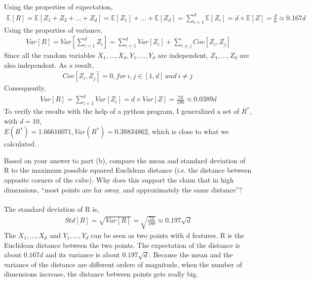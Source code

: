 \documentclass{myhw}
\begin{document}
\begin{homeworkProblem}
\begin{homeworkSection}
\\
Using the properties of expectation, 
\begin{gather*}
\mathbb{E}[R] = \mathbb{E}[Z_1 + Z_2 + ... + Z_d] = \mathbb{E}[Z_1] + ... + \mathbb{E}[Z_d] = \sum_{i=1}^d{\mathbb{E}[Z_i]} = d \times \mathbb{E}[Z] = \frac{d}{6} \approx 0.167d
\end{gather*}
Using the properties of variance,
\begin{gather*}
Var[R] = Var[\sum_{i=1}^d{Z_i}] = \sum_{i=1}^d{Var[Z_i]} + \sum_{i \ne j}{Cov[Z_i, Z_j]}
\end{gather*}
Since all the random variables $X_1, ... , X_d, Y_1, . . . , Y_d$ are independent, $Z_1 , ... , Z_d$ are also independent. As a result, 
\begin{gather*}
Cov[Z_i, Z_j] = 0, for\ i, j \in [1, d]\ and\ i \ne j\
\end{gather*}
Consequently, 
\begin{gather*}
Var[R] = \sum_{i=1}^d{Var[Z_i]} = d \times Var[Z] = \frac{7d}{180}  \approx 0.0389d
\end{gather*}
To verify the results with the help of a python program, I generalized a set of $R^*$, with $d=10$, \\
$E(R^*)=1.66616071, Var(R^*)=0.38834862$, which is close to what we calculated.
\end{homeworkSection}
\begin{homeworkSection}
Based on your answer to part (b), compare the mean and standard deviation of R to the maximum possible squared Euclidean distance (i.e. the distance between opposite corners of the cube). Why does this support the claim that in high dimensions, “most points are far away, and approximately the same distance”? \\
\\
The standard deviation of R is, 
\begin{gather*}
Std[R] = \sqrt{Var[R]} = \sqrt{\frac{7d}{180}} \approx 0.197\sqrt{d}
\end{gather*}
The $X_1, ... , X_d$ and $Y_1, . . . , Y_d$ can be seen as two points with d features. R is the Euclidean distance between the two points. The expectation of the distance is about $0.167d$ and its variance is about $0.197\sqrt{d}$. 
Because the mean and the variance of the distance are different orders of magnitude, when the number of dimensions increase, the distance between points gets really big. 
\end{homeworkSection}
\end{homeworkProblem}
\end{document}
